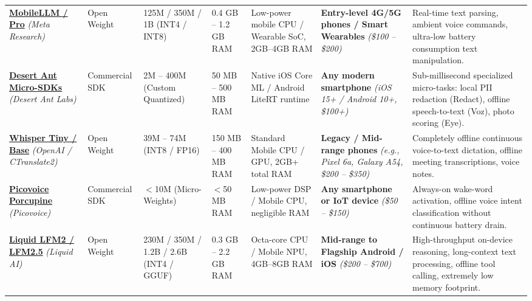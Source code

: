 \documentclass[10pt,landscape,a4paper]{article}
\begin{document}
\begin{longtable}{p{2.6cm} p{1.6cm} p{1.8cm} p{2.2cm} p{2.6cm} p{4.2cm} p{6.8cm}}
    \textbf{\href{https://github.com/facebookresearch/MobileLLM}{MobileLLM / Pro}} \newline \textit{(Meta Research)} & Open Weight & 125M / 350M / 1B \newline (INT4 / INT8) & 0.4 GB -- 1.2 GB RAM & Low-power mobile CPU / Wearable SoC, 2GB--4GB RAM & \textbf{Entry-level 4G/5G phones / Smart Wearables} \newline \textit{(\$100 -- \$200)} & Real-time text parsing, ambient voice commands, ultra-low battery consumption text manipulation. \\

    \textbf{\href{https://desertant.com/}{Desert Ant Micro-SDKs}} \newline \textit{(Desert Ant Labs)} & Commercial SDK & 2M -- 400M \newline (Custom Quantized) & 50 MB -- 500 MB RAM & Native iOS Core ML / Android LiteRT runtime & \textbf{Any modern smartphone} \newline \textit{(iOS 15+ / Android 10+, \$100+)} & Sub-millisecond specialized micro-tasks: local PII redaction (Redact), offline speech-to-text (Voz), photo scoring (Eye). \\

    \textbf{\href{https://aihub.qualcomm.com/models/whisper_tiny}{Whisper Tiny / Base}} \newline \textit{(OpenAI / CTranslate2)} & Open Weight & 39M -- 74M \newline (INT8 / FP16) & 150 MB -- 400 MB RAM & Standard Mobile CPU / GPU, 2GB+ total RAM & \textbf{Legacy / Mid-range phones} \newline \textit{(e.g., Pixel 6a, Galaxy A54, \$200 -- \$350)} & Completely offline continuous voice-to-text dictation, offline meeting transcriptions, voice notes. \\

    \textbf{\href{https://picovoice.ai/}{Picovoice Porcupine}} \newline \textit{(Picovoice)} & Commercial SDK & $<$10M \newline (Micro-Weights) & $<$50 MB RAM & Low-power DSP / Mobile CPU, negligible RAM & \textbf{Any smartphone or IoT device} \newline \textit{(\$50 -- \$150)} & Always-on wake-word activation, offline voice intent classification without continuous battery drain. \\

    \textbf{\href{https://demos.liquid.ai/}{Liquid LFM2 / LFM2.5}} \newline \textit{(Liquid AI)} & Open Weight & 230M / 350M / 1.2B / 2.6B \newline (INT4 / GGUF) & 0.3 GB -- 2.2 GB RAM & Octa-core CPU / Mobile NPU, 4GB--8GB RAM & \textbf{Mid-range to Flagship Android / iOS} \newline \textit{(\$200 -- \$700)} & High-throughput on-device reasoning, long-context text processing, offline tool calling, extremely low memory footprint. \\


\end{longtable}
\end{document}
